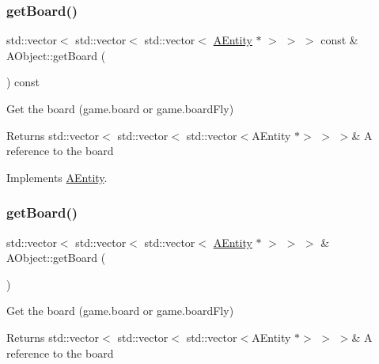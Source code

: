 \subsubsection{\texorpdfstring{get\+Board()}{getBoard()}\hspace{0.1cm}{\footnotesize\ttfamily [1/2]}}
{\footnotesize\ttfamily std\+::vector$<$ std\+::vector$<$ std\+::vector$<$ \hyperlink{class_a_entity}{A\+Entity} $\ast$ $>$ $>$ $>$ const  \& A\+Object\+::get\+Board (\begin{DoxyParamCaption}{ }\end{DoxyParamCaption}) const\hspace{0.3cm}{\ttfamily [virtual]}}



Get the board (game.\+board or game.\+board\+Fly) 

\begin{DoxyReturn}{Returns}
std\+::vector$<$ std\+::vector$<$ std\+::vector$<$\+A\+Entity $\ast$$>$ $>$ $>$\& A reference to the board 
\end{DoxyReturn}


Implements \hyperlink{class_a_entity_a9ed84c8f926cf6032be480ebba7d1820}{A\+Entity}.

\mbox{\label{class_a_object_aba4b07c0456b2c3d42a71529ef40f2d5}} 
\subsubsection{\texorpdfstring{get\+Board()}{getBoard()}\hspace{0.1cm}{\footnotesize\ttfamily [2/2]}}
{\footnotesize\ttfamily std\+::vector$<$ std\+::vector$<$ std\+::vector$<$ \hyperlink{class_a_entity}{A\+Entity} $\ast$ $>$ $>$ $>$ \& A\+Object\+::get\+Board (\begin{DoxyParamCaption}{ }\end{DoxyParamCaption})\hspace{0.3cm}{\ttfamily [virtual]}}



Get the board (game.\+board or game.\+board\+Fly) 

\begin{DoxyReturn}{Returns}
std\+::vector$<$ std\+::vector$<$ std\+::vector$<$\+A\+Entity $\ast$$>$ $>$ $>$\& A reference to the board 
\end{DoxyReturn}



